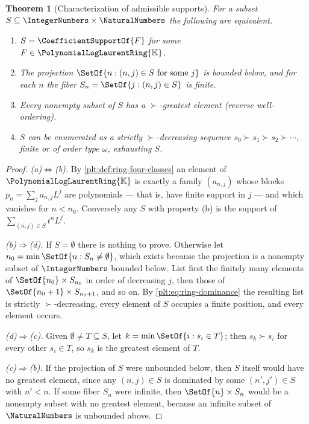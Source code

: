 \documentclass[11pt,oneside]{article}
\theoremstyle{plain}
\newtheorem{theorem}{Theorem}[section]
\theoremstyle{definition}
\theoremstyle{remark}
\newcommand{\K}{\mathbb{K}}
\newcommand{\PLlau}{\PolynomialLogLaurentRing{\K}}       %
\newcommand{\succdom}{\succ}
\begin{document}
\begin{theorem}[Characterization of admissible supports]
\label{plt:thm:ring-support}
For a subset \(S\subseteq\IntegerNumbers\times\NaturalNumbers\) the following
are equivalent.
\begin{enumerate}[label=\textup{(\alph*)}]
\item \(S=\CoefficientSupportOf{F}\) for some \(F\in\PLlau\).
\item The projection \(\SetOf{n:(n,j)\in S\ \text{for some }j}\) is bounded
  below, and for each \(n\) the fiber \(S_n=\SetOf{j:(n,j)\in S}\) is finite.
\item Every nonempty subset of \(S\) has a \(\succdom\)-greatest element
  \textup{(}reverse well-ordering\textup{)}.
\item \(S\) can be enumerated as a strictly \(\succdom\)-decreasing sequence
  \(s_0\succdom s_1\succdom s_2\succdom\cdots\), finite or of order type
  \(\omega\), exhausting \(S\).
\end{enumerate}
\end{theorem}

\begin{proof}
\emph{(a)\(\Leftrightarrow\)(b).}  By
\cref{plt:def:ring-four-classes} an element of \(\PLlau\) is exactly a family
\((a_{n,j})\) whose blocks \(p_n=\sum_ja_{n,j}L^j\) are polynomials --- that is,
have finite support in \(j\) --- and which vanishes for \(n<n_0\).  Conversely
any \(S\) with property (b) is the support of
\(\sum_{(n,j)\in S}t^nL^j\).

\emph{(b)\(\Rightarrow\)(d).}  If \(S=\emptyset\) there is nothing to prove.
Otherwise let \(n_0=\min\SetOf{n:S_n\ne\emptyset}\), which exists because the
projection is a nonempty subset of \(\IntegerNumbers\) bounded below.  List
first the finitely many elements of \(\SetOf{n_0}\times S_{n_0}\) in order of
decreasing \(j\), then those of \(\SetOf{n_0+1}\times S_{n_0+1}\), and so on.
By \eqref{plt:eq:ring-dominance} the resulting list is strictly
\(\succdom\)-decreasing, every element of \(S\) occupies a finite position, and
every element occurs.

\emph{(d)\(\Rightarrow\)(c).}  Given \(\emptyset\ne T\subseteq S\), let
\(k=\min\SetOf{i:s_i\in T}\); then \(s_k\succdom s_i\) for every other
\(s_i\in T\), so \(s_k\) is the greatest element of \(T\).

\emph{(c)\(\Rightarrow\)(b).}  If the projection of \(S\) were unbounded below,
then \(S\) itself would have no greatest element, since any \((n,j)\in S\) is
dominated by some \((n',j')\in S\) with \(n'<n\).  If some fiber \(S_n\) were
infinite, then \(\SetOf{n}\times S_n\) would be a nonempty subset with no
greatest element, because an infinite subset of \(\NaturalNumbers\) is
unbounded above.
\end{proof}
\end{document}
